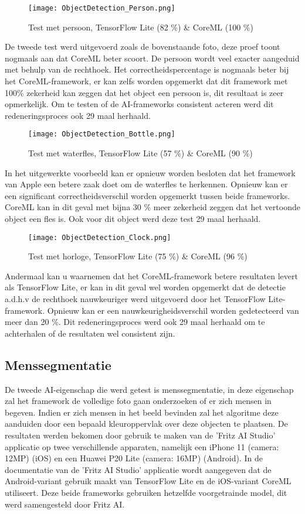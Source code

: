 \begin{figure}[H]
	\centering
	\texttt{[image: ObjectDetection\_Person.png]}
	\caption{Test met persoon, TensorFlow Lite (82 \%) \& CoreML (100 \%)}
\end{figure}
De tweede test werd uitgevoerd zoals de bovenstaande foto, deze proef toont nogmaals aan dat CoreML beter scoort. De persoon wordt veel exacter aangeduid met behulp van de rechthoek. Het correctheidspercentage is nogmaals beter bij het CoreML-framework, er kan zelfs worden opgemerkt dat dit framework met 100\% zekerheid kan zeggen dat het object een persoon is, dit resultaat is zeer opmerkelijk. Om te testen of de AI-frameworks consistent acteren werd dit redeneringsproces ook 29 maal herhaald.

\begin{figure}[H]
	\centering
	\texttt{[image: ObjectDetection\_Bottle.png]}
	\caption{Test met waterfles, TensorFlow Lite (57 \%) \& CoreML (90 \%)}
\end{figure}
In het uitgewerkte voorbeeld kan er opnieuw worden besloten dat het framework van Apple een betere zaak doet om de waterfles te herkennen. Opnieuw kan er een significant correctheidsverschil worden opgemerkt tussen beide frameworks. CoreML kan in dit geval met bijna 30 \% meer zekerheid zeggen dat het vertoonde object een fles is. Ook voor dit object werd deze test 29 maal herhaald.
\begin{figure}[H]
	\centering
	\texttt{[image: ObjectDetection\_Clock.png]}
	\caption{Test met horloge, TensorFlow Lite (75 \%) \& CoreML (96 \%)}
\end{figure}
Andermaal kan u waarnemen dat het CoreML-framework betere resultaten levert als TensorFlow Lite, er kan in dit geval wel worden opgemerkt dat de detectie a.d.h.v de rechthoek nauwkeuriger werd uitgevoerd door het TensorFlow Lite-framework. Opnieuw kan er een nauwkeurigheidsverschil worden gedetecteerd van meer dan 20 \%. Dit redeneringsproces werd ook 29 maal herhaald om te achterhalen of de resultaten wel consistent zijn.

	

\subsection{Menssegmentatie}
De tweede AI-eigenschap die werd getest is menssegmentatie, in deze eigenschap zal het framework de volledige foto gaan onderzoeken of er zich mensen in begeven. Indien er zich mensen in het beeld bevinden zal het algoritme deze aanduiden door een bepaald kleuroppervlak over deze objecten te plaatsen. De resultaten werden bekomen door gebruik te maken van de 'Fritz AI Studio' applicatie op twee verschillende apparaten, namelijk een iPhone 11 (camera: 12MP) (iOS) en een Huawei P20 Lite (camera: 16MP) (Android). In de documentatie van de 'Fritz AI Studio' applicatie wordt aangegeven dat de Android-variant gebruik maakt van TensorFlow Lite en de iOS-variant CoreML utiliseert. Deze beide frameworks gebruiken hetzelfde voorgetrainde model, dit werd samengesteld door Fritz AI.

